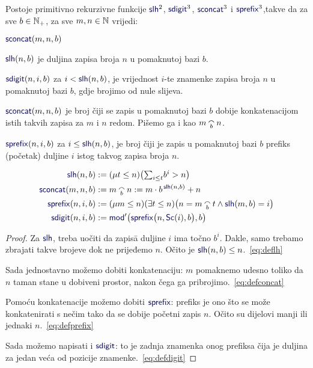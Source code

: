 \begin{lema}[{name=[rad sa zapisima u pomaknutoj bazi]}]\label{lm:ldcpprn}
Postoje primitivno rekurzivne funkcije $\f{slh}^2$, $\f{sdigit}^3$, $\f{sconcat}^3$ i $\f{sprefix}^3$,\newline takve da za sve $b\in{\mathbb N}_+$, za sve $m,n\in{\mathbb N}$ vrijedi:
\begin{labeling}{$\f{sconcat}(m,n,b)$}
    \item[$\f{slh}(n,b)$] je duljina zapisa broja $n$ u pomaknutoj bazi $b$. \item[$\f{sdigit}(n,i,b)$] za $i<\f{slh}(n,b)$, je vrijednost $i$-te znamenke zapisa broja $n$ u pomaknutoj bazi $b$, gdje brojimo od nule slijeva.
    \item[$\f{sconcat}(m,n,b)$] je broj čiji se zapis u pomaknutoj bazi $b$ dobije konkatenacijom istih takvih zapisa za $m$ i $n$ redom. Pišemo ga i kao $m\conc bn$.
    \item[$\f{sprefix}(n,i,b)$] za $i\le\f{slh}(n,b)$, je broj čiji je zapis u pomaknutoj bazi $b$ prefiks (početak) duljine $i$ istog takvog zapisa broja $n$.
\end{labeling}
\end{lema}
\noindent\begin{align}
\label{eq:deflh}
    \f{slh}(n,b)&:=(\mu t\le n)\big(\!
    \textstyle\sum_{i\le t}\!b^i>n
    \big)\\
\label{eq:defconcat}
    \f{sconcat}(m,n,b)&:=m\conc bn:=m\cdot b^{\,\f{slh}(n,b)}+n\\
\label{eq:defprefix}
    \f{sprefix}(n,i,b)&:=(\mu m\le n)(\exists t\le n)\bigl(n=m\conc bt\land\f{slh}(m,b)=i\bigr)\\
\label{eq:defdigit}
    \f{sdigit}(n,i,b)&:=\f{mod}'\bigl(\f{sprefix}\bigl(n,\f{Sc}(i),b\bigr),b\bigr)
\end{align}
\begin{proof}
Za $\f{slh}$, treba uočiti da zapis\=a duljine $i$ ima točno $b^i$. Dakle, samo trebamo zbrajati takve brojeve dok ne prijeđemo $n$. Očito je $\f{slh}(n,b)\le n$.~\eqref{eq:deflh}

Sada jednostavno možemo dobiti konkatenaciju: $m$ pomaknemo udesno toliko da $n$ taman stane u dobiveni prostor, nakon čega ga pribrojimo.~\eqref{eq:defconcat}

Pomoću konkatenacije možemo dobiti $\f{sprefix}$: prefiks je ono što se može konkatenirati s nečim tako da se dobije početni zapis $n$. Očito su dijelovi manji ili jednaki $n$.~\eqref{eq:defprefix} %

Sada možemo napisati i $\f{sdigit}$: to je zadnja znamenka onog prefiksa čija je duljina za jedan veća od pozicije znamenke.~\eqref{eq:defdigit}
\end{proof}

